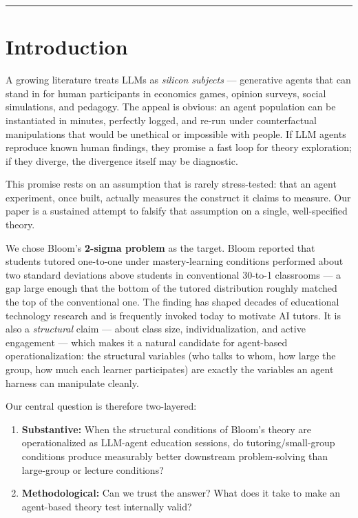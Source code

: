 \documentclass[11pt]{article}
\begin{document}
\hrule

\section{Introduction}

A growing literature treats LLMs as \emph{silicon subjects} --- generative agents
that can stand in for human participants in economics games, opinion surveys, social
simulations, and pedagogy.  The appeal is obvious: an agent population can be
instantiated in minutes, perfectly logged, and re-run under counterfactual
manipulations that would be unethical or impossible with people.  If LLM agents
reproduce known human findings, they promise a fast loop for theory exploration; if
they diverge, the divergence itself may be diagnostic.

This promise rests on an assumption that is rarely stress-tested: that an agent
experiment, once built, actually measures the construct it claims to measure.  Our
paper is a sustained attempt to falsify that assumption on a single, well-specified
theory.

We chose Bloom's \textbf{2-sigma problem} \citep{bloom1984} as the target.  Bloom
reported that students tutored one-to-one under mastery-learning conditions performed
about two standard deviations above students in conventional 30-to-1 classrooms --- a
gap large enough that the bottom of the tutored distribution roughly matched the top
of the conventional one.  The finding has shaped decades of educational technology
research and is frequently invoked today to motivate AI tutors.  It is also a
\emph{structural} claim --- about class size, individualization, and active
engagement --- which makes it a natural candidate for agent-based operationalization:
the structural variables (who talks to whom, how large the group, how much each
learner participates) are exactly the variables an agent harness can manipulate
cleanly.

Our central question is therefore two-layered:
\begin{enumerate}
  \item \textbf{Substantive:} When the structural conditions of Bloom's theory are
    operationalized as LLM-agent education sessions, do tutoring/small-group
    conditions produce measurably better downstream problem-solving than large-group
    or lecture conditions?
  \item \textbf{Methodological:} Can we trust the answer?  What does it take to make
    an agent-based theory test internally valid?
\end{enumerate}
\end{document}
